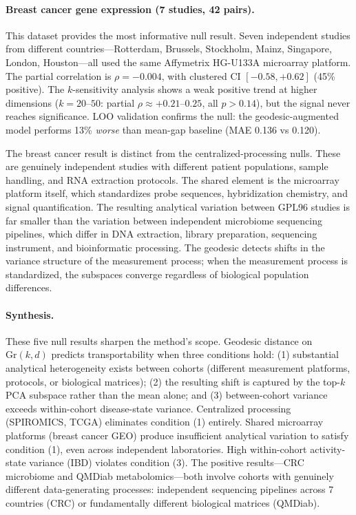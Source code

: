 \documentclass{article}
\begin{document}
\paragraph{Breast cancer gene expression (7 studies, 42 pairs).} This dataset provides the most informative null result. Seven independent studies from different countries---Rotterdam, Brussels, Stockholm, Mainz, Singapore, London, Houston---all used the same Affymetrix HG-U133A microarray platform. The partial correlation is $\rho = -0.004$, with clustered CI $[-0.58, +0.62]$ (45\% positive). The $k$-sensitivity analysis shows a weak positive trend at higher dimensions ($k = 20$--$50$: partial $\rho \approx +0.21$--$0.25$, all $p > 0.14$), but the signal never reaches significance. LOO validation confirms the null: the geodesic-augmented model performs 13\% \emph{worse} than mean-gap baseline (MAE 0.136 vs 0.120).

The breast cancer result is distinct from the centralized-processing nulls. These are genuinely independent studies with different patient populations, sample handling, and RNA extraction protocols. The shared element is the microarray platform itself, which standardizes probe sequences, hybridization chemistry, and signal quantification. The resulting analytical variation between GPL96 studies is far smaller than the variation between independent microbiome sequencing pipelines, which differ in DNA extraction, library preparation, sequencing instrument, and bioinformatic processing. The geodesic detects shifts in the variance structure of the measurement process; when the measurement process is standardized, the subspaces converge regardless of biological population differences.

\paragraph{Synthesis.} These five null results sharpen the method's scope. Geodesic distance on $\mathrm{Gr}(k,d)$ predicts transportability when three conditions hold: (1) substantial analytical heterogeneity exists between cohorts (different measurement platforms, protocols, or biological matrices); (2) the resulting shift is captured by the top-$k$ PCA subspace rather than the mean alone; and (3) between-cohort variance exceeds within-cohort disease-state variance. Centralized processing (SPIROMICS, TCGA) eliminates condition (1) entirely. Shared microarray platforms (breast cancer GEO) produce insufficient analytical variation to satisfy condition (1), even across independent laboratories. High within-cohort activity-state variance (IBD) violates condition (3). The positive results---CRC microbiome and QMDiab metabolomics---both involve cohorts with genuinely different data-generating processes: independent sequencing pipelines across 7 countries (CRC) or fundamentally different biological matrices (QMDiab).
\end{document}
